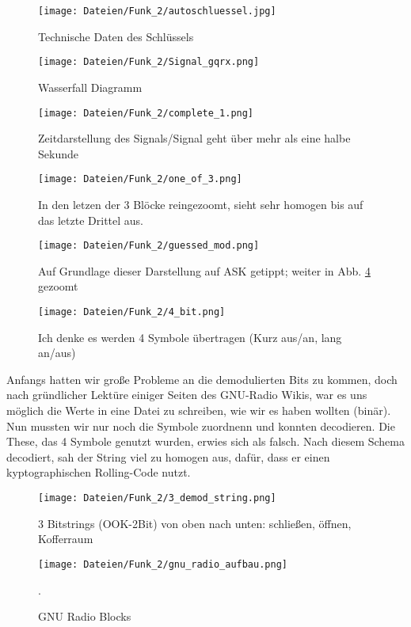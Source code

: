 \documentclass[12pt,a4paper]{article}
\begin{document}
\begin{figure}[H]
\centering
\texttt{[image: Dateien/Funk\_2/autoschluessel.jpg]}
\caption{Technische Daten des Schlüssels} 
\label{fig:schlu}
\end{figure}
\begin{figure}[H]
\centering
\texttt{[image: Dateien/Funk\_2/Signal\_gqrx.png]}
\caption{Wasserfall Diagramm} 
\label{fig:7}
\end{figure}
\begin{figure}[H]
\centering
\texttt{[image: Dateien/Funk\_2/complete\_1.png]}
\caption{Zeitdarstellung des Signals/Signal geht über mehr als eine halbe Sekunde} 
\label{fig:8}
\end{figure}
\begin{figure}[H]
\centering
\texttt{[image: Dateien/Funk\_2/one\_of\_3.png]}
\caption{In den letzen der 3 Blöcke reingezoomt, sieht sehr homogen bis auf das letzte Drittel aus.} 
\label{fig:10}
\end{figure}
\begin{figure}[H]
\centering
\texttt{[image: Dateien/Funk\_2/guessed\_mod.png]}
\caption{Auf Grundlage dieser Darstellung auf ASK getippt; weiter in Abb. \ref{fig:10} gezoomt} 
\label{fig:11}
\end{figure}
\begin{figure}[H]
\centering
\texttt{[image: Dateien/Funk\_2/4\_bit.png]}
\caption{Ich denke es werden 4 Symbole übertragen (Kurz aus/an, lang an/aus)} 
\label{fig:12}
\end{figure}
Anfangs hatten wir große Probleme an die demodulierten Bits zu kommen, doch nach gründlicher Lektüre einiger Seiten des GNU-Radio Wikis, war es uns möglich die Werte in eine Datei zu schreiben, wie wir es haben wollten (binär). Nun mussten wir nur noch die Symbole zuordnenn und konnten decodieren. Die These, das 4 Symbole genutzt wurden, erwies sich als falsch. Nach diesem Schema decodiert, sah der String viel zu homogen aus, dafür, dass er einen kyptographischen Rolling-Code nutzt.
\begin{figure}[H]
\centering
\texttt{[image: Dateien/Funk\_2/3\_demod\_string.png]}
\caption{3 Bitstrings (OOK-2Bit) von oben nach unten: schließen, öffnen, Kofferraum}
\label{fig:13}
\end{figure}
\begin{figure}[H]
\centering
\texttt{[image: Dateien/Funk\_2/gnu\_radio\_aufbau.png]}
\caption{GNU Radio Blocks} 
\label{fig:9}.
\end{figure}
\end{document}
